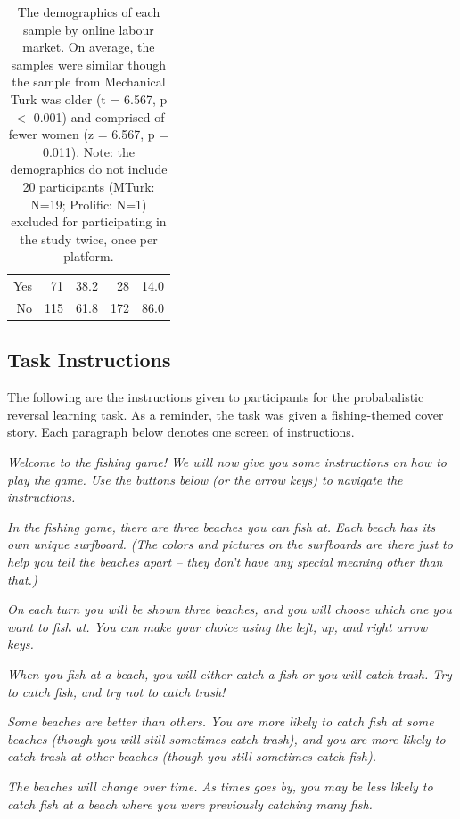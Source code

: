 \documentclass[a4paper,notitlepage,12pt]{article}
\begin{document}
\begin{table}[!h]
\begin{tabular}{ rrrrr }
Yes            &      71 &  38.2 &       28 &  14.0 \\
No             &     115 &  61.8 &      172 &  86.0 \\
\bottomrule
\end{tabular}
\captionsetup{width=0.88\textwidth}
\caption{The demographics of each sample by online labour market. On average, the samples were similar though the sample from Mechanical Turk was older (t = 6.567, p $<$ 0.001) and comprised of fewer women (z = 6.567, p = 0.011). Note: the demographics do not include 20 participants (MTurk: N=19; Prolific: N=1) excluded for participating in the study twice, once per platform.}
\label{tab:demographics}
\end{table}

\subsection*{Task Instructions}

The following are the instructions given to participants for the probabalistic reversal learning task. As a reminder, the task was given a fishing-themed cover story. Each paragraph below denotes one screen of instructions.

\textit{Welcome to the fishing game! We will now give you some instructions on how to play the game. Use the buttons below (or the arrow keys) to navigate the instructions.}

\textit{In the fishing game, there are three beaches you can fish at. Each beach has its own unique surfboard. (The colors and pictures on the surfboards are there just to help you tell the beaches apart – they don’t have any special meaning other than that.)}

\textit{On each turn you will be shown three beaches, and you will choose which one you want to fish at. You can make your choice using the left, up, and right arrow keys.}

\textit{When you fish at a beach, you will either catch a fish or you will catch trash. Try to catch fish, and try not to catch trash!}

\textit{Some beaches are better than others. You are more likely to catch fish at some beaches (though you will still sometimes catch trash), and you are more likely to catch trash at other beaches (though you still sometimes catch fish).}

\textit{The beaches will change over time. As times goes by, you may be less likely to catch fish at a beach where you were previously catching many fish.}
\end{document}
